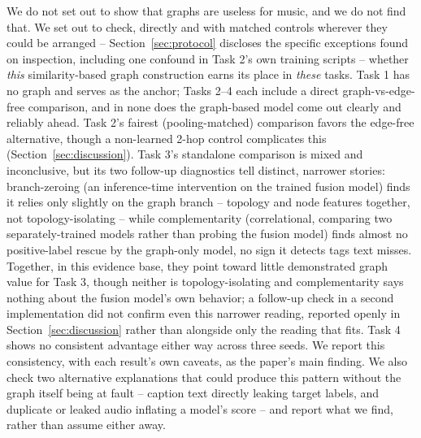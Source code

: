 We do not set out to show that graphs are useless for music, and we do not find that. We set
out to check, directly and with matched controls wherever they could be arranged --
Section~\ref{sec:protocol} discloses the specific exceptions found on inspection, including
one confound in Task 2's own training scripts -- whether \emph{this} similarity-based graph
construction earns its place in \emph{these} tasks. Task 1 has no graph and serves as the
anchor; Tasks 2--4 each include a direct graph-vs-edge-free comparison, and in none does the
graph-based model come out clearly and reliably ahead. Task 2's fairest (pooling-matched)
comparison favors the edge-free alternative, though a non-learned 2-hop control complicates
this (Section~\ref{sec:discussion}). Task 3's standalone comparison is mixed and
inconclusive, but its two follow-up diagnostics tell distinct, narrower stories:
branch-zeroing (an inference-time intervention on the trained fusion model) finds it relies
only slightly on the graph branch -- topology and node features together, not
topology-isolating -- while complementarity (correlational, comparing two separately-trained
models rather than probing the fusion model) finds almost no positive-label rescue by the
graph-only model, no sign it detects tags text misses. Together, in this evidence base, they
point toward little demonstrated graph value for Task 3, though neither is topology-isolating
and complementarity says nothing about the fusion model's own behavior; a follow-up check in
a second implementation did not confirm even this narrower reading, reported openly in
Section~\ref{sec:discussion} rather than alongside only the reading that fits. Task 4 shows
no consistent advantage either way across three seeds. We report this consistency, with each
result's own caveats, as the paper's main finding. We also check two alternative explanations
that could produce this pattern without the graph itself being at fault -- caption text
directly leaking target labels, and duplicate or leaked audio inflating a model's score --
and report what we find, rather than assume either away.
